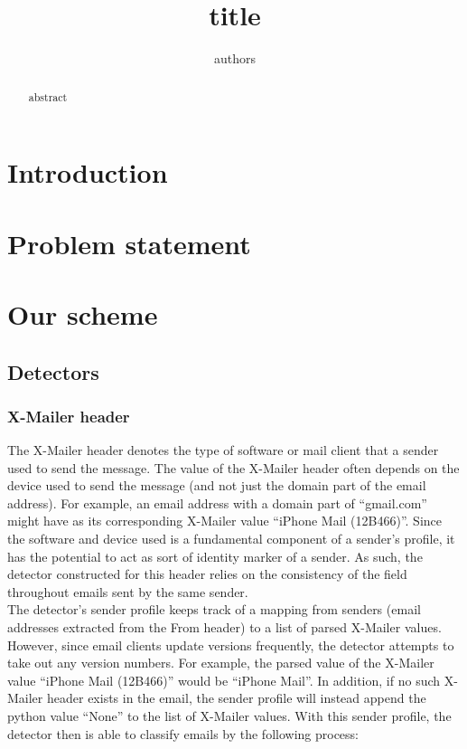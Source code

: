 \documentclass[letterpaper]{article}
\newcommand\tab[1][1cm]{\hspace*{#1}}
\begin{document}
\title{title}
\author{authors}
\maketitle

\begin{abstract}
abstract
\end{abstract}

\section{Introduction}
\section{Problem statement}
\section{Our scheme}

\subsection{Detectors}
\subsubsection{X-Mailer header}
\tab The X-Mailer header denotes the type of software or mail client that a sender used to send the message. The value of the X-Mailer header often depends on the device used to send the message (and not just the domain part of the email address). For example, an email address with a domain part of	``gmail.com'' might have as its corresponding X-Mailer value ``iPhone Mail (12B466)''. Since the software and device used is a fundamental component of a sender's profile, it has the potential to act as sort of identity marker of a sender. As such, the detector constructed for this header relies on the consistency of the field throughout emails sent by the same sender.\\
\tab The detector's sender profile keeps track of a mapping from senders (email addresses extracted from the From header) to a list of parsed X-Mailer values. However, since email clients update versions frequently, the detector attempts to take out any version numbers. For example, the parsed value of the X-Mailer value ``iPhone Mail (12B466)'' would be ``iPhone Mail''. In addition, if no such X-Mailer header exists in the email, the sender profile will instead append the python value ``None'' to the list of X-Mailer values. With this sender profile, the detector then is able to classify emails by the following process:
\end{document}
